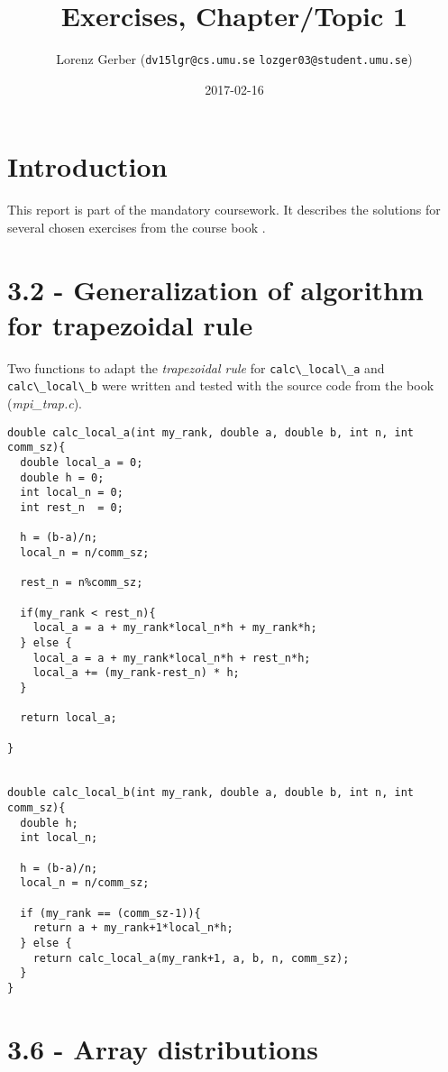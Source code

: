 \documentclass[a4paper,11pt,twoside]{article}
\title{Exercises, Chapter/Topic 1}
\author{Lorenz Gerber ({\tt{dv15lgr@cs.umu.se}} {\tt{lozger03@student.umu.se}})}
\date{2017-02-16}
\begin{document}
\lstset{language=C}
\maketitle
\thispagestyle{empty}
\newpage
\tableofcontents
\thispagestyle{empty}
\newpage

\clearpage
{}

\section{Introduction}
This report is part of the mandatory coursework. It describes the solutions for several chosen exercises from the course book \cite{pacheco2011}.

\section{3.2 - Generalization of algorithm for trapezoidal rule}
Two functions to adapt the \textit{trapezoidal rule} for \verb+calc\_local\_a+ and \verb+calc\_local\_b+ were written and tested with the source code from the book (\textit{mpi\_trap.c}).

\begin{verbatim}
double calc_local_a(int my_rank, double a, double b, int n, int comm_sz){
  double local_a = 0;
  double h = 0;
  int local_n = 0;
  int rest_n  = 0;

  h = (b-a)/n;
  local_n = n/comm_sz;

  rest_n = n%comm_sz;

  if(my_rank < rest_n){
    local_a = a + my_rank*local_n*h + my_rank*h;
  } else {
    local_a = a + my_rank*local_n*h + rest_n*h;
    local_a += (my_rank-rest_n) * h;
  }

  return local_a;

}


double calc_local_b(int my_rank, double a, double b, int n, int comm_sz){
  double h;
  int local_n;

  h = (b-a)/n;
  local_n = n/comm_sz;

  if (my_rank == (comm_sz-1)){
    return a + my_rank+1*local_n*h;
  } else {
    return calc_local_a(my_rank+1, a, b, n, comm_sz);
  }
}

\end{verbatim}

\section{3.6 - Array distributions}
\end{document}
